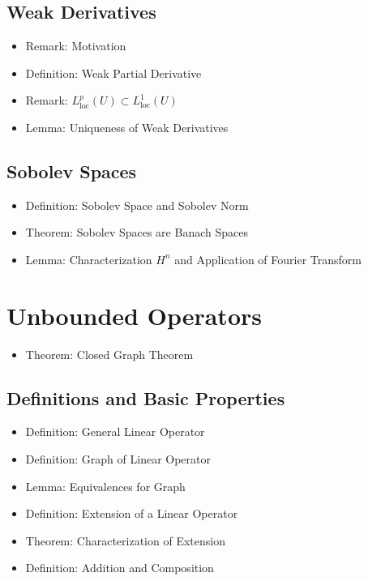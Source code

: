 \documentclass[8pt,twocolumn]{article}
\begin{document}
    \subsection{Weak Derivatives} %
    \label{sub:weak_derivatives}
      \begin{itemize}
        \item Remark: Motivation
        \item Definition: Weak Partial Derivative
        \item Remark: $L^p_\mathrm{loc}(U)\subset L^1_\mathrm{loc}(U)$
        \item Lemma: Uniqueness of Weak Derivatives
      \end{itemize}

    \subsection{Sobolev Spaces} %
    \label{sub:sobolev_spaces}
      \begin{itemize}
        \item Definition: Sobolev Space and Sobolev Norm
        \item Theorem: Sobolev Spaces are Banach Spaces
        \item Lemma: Characterization $H^n$ and Application of Fourier Transform
      \end{itemize}

  \section{Unbounded Operators} %
  \label{sec:unbounded_operators}
    \begin{itemize}
      \item Theorem: Closed Graph Theorem
    \end{itemize}

    \subsection{Definitions and Basic Properties} %
    \label{sub:definitions_and_basic_properties}
      \begin{itemize}
        \item Definition: General Linear Operator
        \item Definition: Graph of Linear Operator
        \item Lemma: Equivalences for Graph
        \item Definition: Extension of a Linear Operator
        \item Theorem: Characterization of Extension
        \item Definition: Addition and Composition
      \end{itemize}
\end{document}
